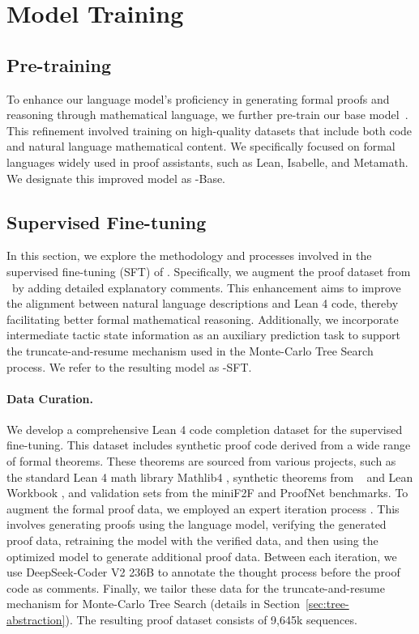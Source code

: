 \section{Model Training}

\subsection{Pre-training}

To enhance our language model's proficiency in generating formal proofs and reasoning through mathematical language, we further pre-train our base model~\citep{shao2024deepseekmath}. This refinement involved training on high-quality datasets that include both code and natural language mathematical content. We specifically focused on formal languages widely used in proof assistants, such as Lean, Isabelle, and Metamath. We designate this improved model as \thiswork-Base.

\subsection{Supervised Fine-tuning}

In this section, we explore the methodology and processes involved in the supervised fine-tuning (SFT) of \thiswork. Specifically, we augment the proof dataset from \lastwork~by adding detailed explanatory comments. This enhancement aims to improve the alignment between natural language descriptions and Lean 4 code, thereby facilitating better formal mathematical reasoning. Additionally, we incorporate intermediate tactic state information as an auxiliary prediction task to support the truncate-and-resume mechanism used in the Monte-Carlo Tree Search process. We refer to the resulting model as \thiswork-SFT.

\vspace{-0.1in}

\paragraph{Data Curation.}
We develop a comprehensive Lean 4 code completion dataset for the supervised fine-tuning. This dataset includes synthetic proof code derived from a wide range of formal theorems. These theorems are sourced from various projects, such as the standard Lean 4 math library Mathlib4 \citep{mathlib}, synthetic theorems from \lastwork~\citep{xin2024deepseek} and Lean Workbook \citep{ying2024lean}, and validation sets from the miniF2F \citep{zheng2021minif2f} and ProofNet \citep{azerbayev2023proofnet} benchmarks. To augment the formal proof data, we employed an expert iteration process \citep{polu2020generative}. This involves generating proofs using the language model, verifying the generated proof data, retraining the model with the verified data, and then using the optimized model to generate additional proof data. Between each iteration, we use DeepSeek-Coder V2 236B \citep{zhu2024deepseek} to annotate the thought process before the proof code as comments. Finally, we tailor these data for the truncate-and-resume mechanism for Monte-Carlo Tree Search (details in Section~\ref{sec:tree-abstraction}). The resulting proof dataset consists of 9,645k sequences.

